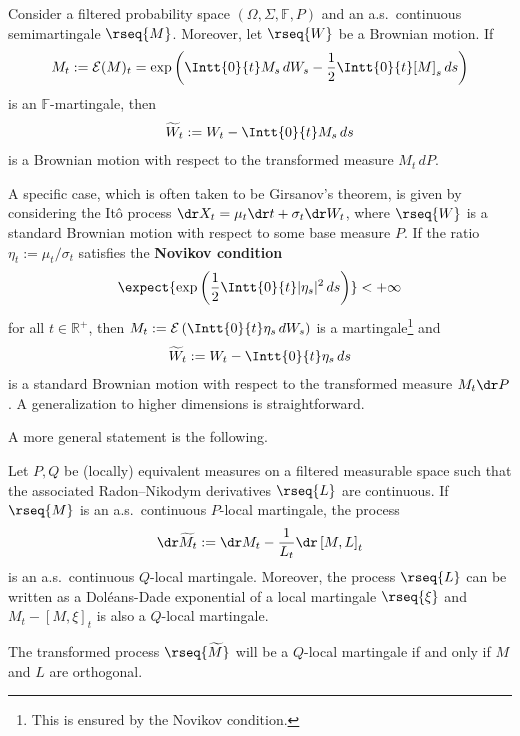     \begin{theorem}[Girsanov]\label{stoch:girsanov}
        Consider a filtered probability space $(\Omega,\Sigma,\mathbb{F},P)$ and an a.s.~continuous semimartingale $\rseq{M}$. Moreover, let $\rseq{W}$ be a Brownian motion. If
        \begin{gather}
            M_t := \mathcal{E}(M)_t = \exp\left(\Intt{0}{t}M_s\,dW_s - \frac{1}{2}\Intt{0}{t}[M]_s\,ds\right)
        \end{gather}
        is an $\mathbb{F}$-martingale, then
        \begin{gather}
            \widetilde{W}_t := W_t - \Intt{0}{t}M_s\,ds
        \end{gather}
        is a Brownian motion with respect to the transformed measure $M_t\,dP$.
    \end{theorem}
    \begin{example}[It\^o process]
        A specific case, which is often taken to be Girsanov's theorem, is given by considering the It\^o process $\dr X_t = \mu_t\dr t + \sigma_t \dr W_t$, where $\rseq{W}$ is a standard Brownian motion with respect to some base measure $P$. If the ratio $\eta_t := \mu_t/\sigma_t$ satisfies the \textbf{Novikov condition}
        \begin{gather}
            \expect{\exp\left(\frac{1}{2}\Intt{0}{t}|\eta_s|^2\,ds\right)}<+\infty
        \end{gather}
        for all $t\in\mathbb{R}^+$, then $M_t:=\mathcal{E}\left(\Intt{0}{t}\eta_s\,dW_s\right)$ is a martingale\footnote{This is ensured by the Novikov condition.} and
        \begin{gather}
            \widetilde{W}_t := W_t - \Intt{0}{t}\eta_s\,ds
        \end{gather}
        is a standard Brownian motion with respect to the transformed measure $M_t\dr P$. A generalization to higher dimensions is straightforward.
    \end{example}

    A more general statement is the following.
    \begin{theorem}
        Let $P,Q$ be (locally) equivalent measures on a filtered measurable space such that the associated Radon--Nikodym derivatives $\rseq{L}$ are continuous. If $\rseq{M}$ is an a.s.~continuous $P$-local martingale, the process
        \begin{gather}
            \dr\widetilde{M}_t := \dr M_t - \frac{1}{L_t}\dr\left[M,L\right]_t
        \end{gather}
        is an a.s.~continuous $Q$-local martingale. Moreover, the process $\rseq{L}$ can be written as a Dol\'eans-Dade exponential of a local martingale $\rseq{\xi}$ and $M_t-[M,\xi]_t$ is also a $Q$-local martingale.
    \end{theorem}
    \begin{result}
        The transformed process $\rseq{\widetilde{M}}$ will be a $Q$-local martingale if and only if $M$ and $L$ are orthogonal.
    \end{result}

